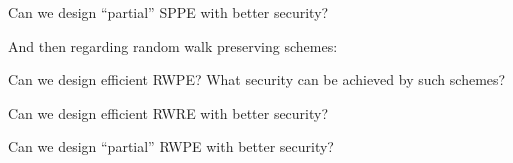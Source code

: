 \begin{question}
Can we design ``partial'' SPPE with better security?
\end{question}

And then regarding random walk preserving schemes:

\begin{question}
Can we design efficient RWPE?  What security can be achieved by such schemes?
\end{question}


\begin{question}
Can we design efficient RWRE with better security?
\end{question}

\begin{question}
Can we design ``partial'' RWPE with better security?
\end{question}


